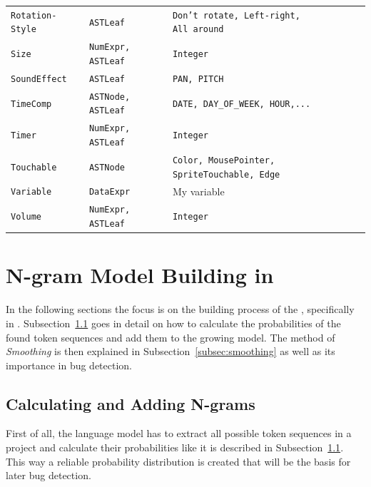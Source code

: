 \begin{table}[H]
\begin{tabular}[t]{lll}
   		\texttt{Rotation-Style} & \texttt{ASTLeaf} & \parbox[t]{7cm}{\texttt{Don't rotate, Left-right,\\ All around}} \\
   		\vspace{10pt}
    		\texttt{Size} & \texttt{NumExpr, ASTLeaf} & \texttt{Integer} \\
    		\vspace{10pt}
    		\texttt{SoundEffect} & \texttt{ASTLeaf} & \texttt{PAN, PITCH} \\
    		\vspace{10pt}
    		\texttt{TimeComp} & \texttt{ASTNode, ASTLeaf} & \texttt{DATE, DAY\_OF\_WEEK, HOUR,...} \\
    		\vspace{10pt}
    		\texttt{Timer} & \texttt{NumExpr, ASTLeaf} & \texttt{Integer} \\
    		\vspace{10pt} 
    		\texttt{Touchable} & \texttt{ASTNode} & \parbox[t]{7cm}{\texttt{Color, MousePointer, SpriteTouchable, Edge}} \\
    		\vspace{10pt}
    		\texttt{Variable} & \texttt{DataExpr} & My variable \\ 
    		\vspace{10pt}
        \texttt{Volume} & \texttt{NumExpr, ASTLeaf} & \texttt{Integer} \\     
    \bottomrule
    \end{tabular}
\end{table}

\section{N-gram Model Building in \scratch{}}\label{sec:model}
In the following sections the focus is on the building process of the \ngram{}, specifically in \scratch{}. Subsection~\ref{subsec:n-grams} goes in detail on how to calculate the probabilities of the found token sequences and add them to the growing model. The method of \textit{Smoothing} is then explained in Subsection~\ref{subsec:smoothing} as well as its importance in bug detection.

\subsection{Calculating and Adding N-grams}\label{subsec:n-grams}
First of all, the language model has to extract all possible token sequences in a \scratch{} project and calculate their probabilities like it is described in Subsection~\ref{subsec:n-grams}. This way a reliable probability distribution is created that will be the basis for later bug detection. 

